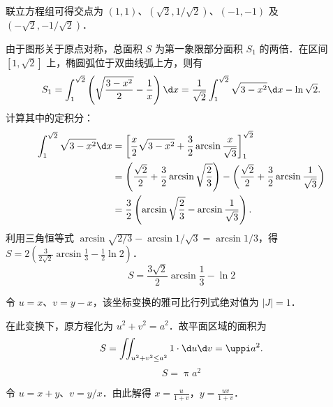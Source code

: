 \begin{solution}
     联立方程组可得交点为 $(1, 1)$、$(\sqrt{2}, 1/\sqrt{2})$、$(-1, -1)$ 及 $(-\sqrt{2}, -1/\sqrt{2})$．

    由于图形关于原点对称，总面积 $S$ 为第一象限部分面积 $S_1$ 的两倍．在区间 $[1, \sqrt{2}]$ 上，椭圆弧位于双曲线弧上方，则有
    \begin{equation}
        S_1 = \int_{1}^{\sqrt{2}} \left( \sqrt{\frac{3 - x^2}{2}} - \frac{1}{x} \right) \d x = \frac{1}{\sqrt{2}} \int_{1}^{\sqrt{2}} \sqrt{3 - x^2} \d x - \ln \sqrt{2}.
    \end{equation}
    计算其中的定积分：
    \begin{equation}
        \begin{aligned}
            \int_{1}^{\sqrt{2}} \sqrt{3 - x^2} \d x & = \left[ \frac{x}{2} \sqrt{3 - x^2} + \frac{3}{2} \arcsin \frac{x}{\sqrt{3}} \right]_{1}^{\sqrt{2}}                                                       \\
                                                    & = \left( \frac{\sqrt{2}}{2} + \frac{3}{2} \arcsin \sqrt{\frac{2}{3}} \right) - \left( \frac{\sqrt{2}}{2} + \frac{3}{2} \arcsin \frac{1}{\sqrt{3}} \right) \\
                                                    & = \frac{3}{2} \left( \arcsin \sqrt{\frac{2}{3}} - \arcsin \frac{1}{\sqrt{3}} \right).
        \end{aligned}
    \end{equation}
    利用三角恒等式 $\arcsin \sqrt{2/3} - \arcsin 1/\sqrt{3} = \arcsin 1/3$，得 $S = 2 \left( \frac{3}{2\sqrt{2}} \arcsin \frac{1}{3} - \frac{1}{2} \ln 2 \right)$．
    \begin{equation}
        S = \boxed{\frac{3\sqrt{2}}{2} \arcsin \frac{1}{3} - \ln 2}
    \end{equation}

     令 $u = x$、$v = y - x$，该坐标变换的雅可比行列式绝对值为 $|J| = 1$．

    在此变换下，原方程化为 $u^2 + v^2 = a^2$．故平面区域的面积为
    \begin{equation}
        S = \iint_{u^2 + v^2 \le a^2} 1 \cdot \d u \d v = \uppi a^2.
    \end{equation}
    \begin{equation}
        S = \boxed{\uppi a^2}
    \end{equation}

     令 $u = x + y$、$v = y/x$．由此解得 $x = \frac{u}{1+v}$，$y = \frac{uv}{1+v}$．


\end{solution}
